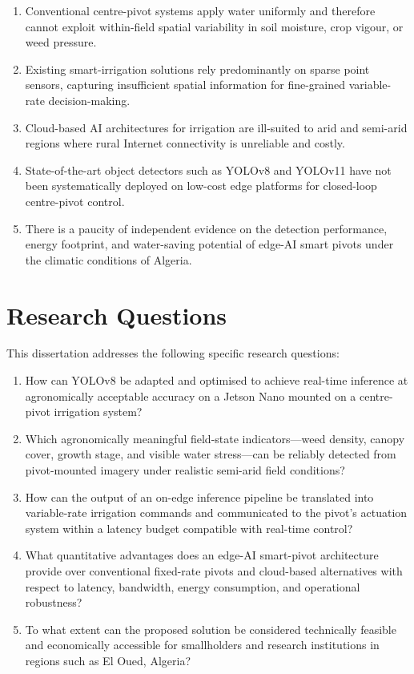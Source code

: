 \documentclass[12pt,a4paper]{report}
\begin{document}
\begin{enumerate}[label=\textbf{G\arabic*.}, leftmargin=2em]
    \item Conventional centre-pivot systems apply water uniformly and therefore cannot exploit within-field spatial variability in soil moisture, crop vigour, or weed pressure.
    \item Existing smart-irrigation solutions rely predominantly on sparse point sensors, capturing insufficient spatial information for fine-grained variable-rate decision-making.
    \item Cloud-based AI architectures for irrigation are ill-suited to arid and semi-arid regions where rural Internet connectivity is unreliable and costly.
    \item State-of-the-art object detectors such as YOLOv8 and YOLOv11 have not been systematically deployed on low-cost edge platforms for closed-loop centre-pivot control.
    \item There is a paucity of independent evidence on the detection performance, energy footprint, and water-saving potential of edge-AI smart pivots under the climatic conditions of Algeria.
\end{enumerate}

\section{Research Questions}

This dissertation addresses the following specific research questions:

\begin{enumerate}[label=\textbf{RQ\arabic*.}, leftmargin=2em]
    \item How can YOLOv8 be adapted and optimised to achieve real-time inference at agronomically acceptable accuracy on a Jetson Nano mounted on a centre-pivot irrigation system?
    \item Which agronomically meaningful field-state indicators---weed density, canopy cover, growth stage, and visible water stress---can be reliably detected from pivot-mounted imagery under realistic semi-arid field conditions?
    \item How can the output of an on-edge inference pipeline be translated into variable-rate irrigation commands and communicated to the pivot's actuation system within a latency budget compatible with real-time control?
    \item What quantitative advantages does an edge-AI smart-pivot architecture provide over conventional fixed-rate pivots and cloud-based alternatives with respect to latency, bandwidth, energy consumption, and operational robustness?
    \item To what extent can the proposed solution be considered technically feasible and economically accessible for smallholders and research institutions in regions such as El Oued, Algeria?
\end{enumerate}
\end{document}
